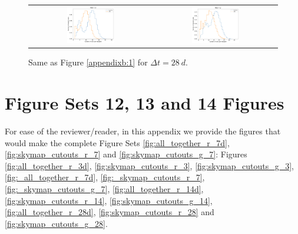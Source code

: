 \documentclass[preprintm,linenumbers]{aastex631}
\begin{document}
\begin{figure}
\begin{tabular}{c c}
				 \includegraphics[width=0.4\textwidth]{results/histograms/hist_first_year_one_snap_v4_0_10yrs_db_noDD_noTwi_CountMetric_doAllTemplateMetrics_reduceCount_z_28_noDD_noTwi.pdf} &
				\includegraphics[width=0.4\textwidth]{results/histograms/hist_first_year_one_snap_v4_0_10yrs_db_noDD_noTwi_CountMetric_doAllTemplateMetrics_reduceCount_y_28_noDD_noTwi.pdf} \\
    			
			\end{tabular}
			\caption{ Same as Figure \ref{appendixb:1} for $\Delta t = 28\ \si{d}$. \label{appendixb:4}}
		\end{figure}

  \section{Figure Sets 12, 13 and 14 Figures}

    For ease of the reviewer/reader, in this appendix we provide the figures that would make the complete Figure Sets \ref{fig:all_together_r_7d}, \ref{fig:skymap_cutouts_r_7} and \ref{fig:skymap_cutouts_g_7}: Figures 
    \ref{fig:all_together_r_3d}, \ref{fig:skymap_cutouts_r_3}, \ref{fig:skymap_cutouts_g_3},
    \ref{fig:_all_together_r_7d}, \ref{fig:_skymap_cutouts_r_7}, \ref{fig:_skymap_cutouts_g_7},
    \ref{fig:all_together_r_14d}, \ref{fig:skymap_cutouts_r_14}, \ref{fig:skymap_cutouts_g_14},
    \ref{fig:all_together_r_28d}, \ref{fig:skymap_cutouts_r_28} and \ref{fig:skymap_cutouts_g_28}.
\end{document}
